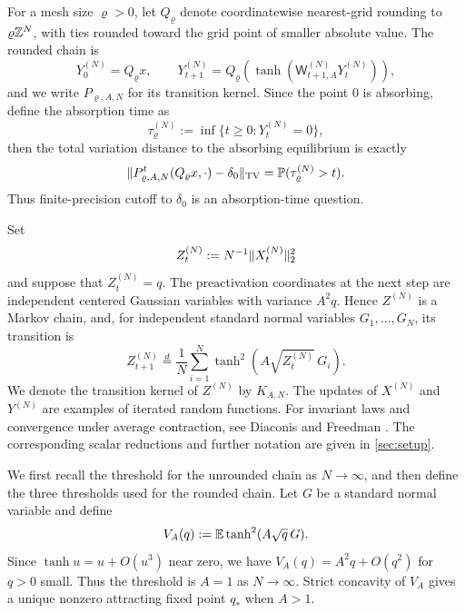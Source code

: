 \documentclass[11pt,reqno,a4paper]{article}
\newcommand{\Pp}{\P}
\newcommand{\Ee}{\E}
\newcommand{\TV}{\mathrm{TV}}
\begin{document}
For a mesh size $\varrho>0$, let $Q_\varrho$ denote coordinatewise
nearest-grid rounding to $\varrho\mathbb{Z}^N$, with ties rounded toward the grid
point of smaller absolute value. The rounded chain is
\begin{equation}\label{eq:intro-rounded-chain}
  Y_0^{(N)}=Q_\varrho x,
  \qquad
  Y_{t+1}^{(N)}
  =
  Q_\varrho\left(
    \tanh\left(\mathsf W_{t+1,A}^{(N)}Y_t^{(N)}\right)
  \right),
\end{equation}
and we write $P_{\varrho,A,N}$ for its transition kernel. Since the point $0$ is
absorbing, define the absorption time as
\begin{equation}\label{eq:intro-absorption-time}
  \tau_\varrho^{(N)}
  :=
  \inf\{t\geq0:Y_t^{(N)}=0\},
\end{equation}
then the total variation distance to the absorbing equilibrium is exactly
\begin{equation}\label{eq:intro-tv-absorption}
  \norm{
    P_{\varrho,A,N}^t(Q_\varrho x,\cdot)-\delta_0
  }_{\TV}
  =
  \Pp(\tau_\varrho^{(N)}>t).
\end{equation}
Thus finite-precision cutoff to $\delta_0$ is an absorption-time question.

Set
\begin{equation*}
  Z_t^{(N)}:=N^{-1}\lVert X_t^{(N)}\rVert_2^2
\end{equation*}
and suppose that $Z_t^{(N)}=q$. The preactivation coordinates at the next
step are independent centered Gaussian variables with variance $A^2q$.
Hence $Z^{(N)}$ is a Markov chain, and, for independent standard normal
variables $G_1,\ldots,G_N$, its transition is
\begin{equation}\label{eq:intro-radius-chain}
  Z_{t+1}^{(N)}
  \stackrel{d}{=}
  \frac1N\sum_{i=1}^N
  \tanh^2\left(A\sqrt{Z_t^{(N)}}\,G_i\right).
\end{equation}
We denote the transition kernel of $Z^{(N)}$ by $K_{A,N}$.
The updates of $X^{(N)}$ and $Y^{(N)}$ are examples of iterated random
functions. For invariant laws and convergence under average contraction, see
Diaconis and Freedman \cite{diaconis-freedman1999}. The corresponding
scalar reductions and further notation are given in \cref{sec:setup}.

\smallskip

We first recall the threshold for the unrounded chain as $N\to\infty$, and
then define the three thresholds used for the rounded chain. Let $G$ be a
standard normal variable and define
\begin{equation}\label{eq:intro-mean-field-map}
  V_A(q):=\Ee\tanh^2(A\sqrt q\,G).
\end{equation}
Since $\tanh u=u+O(u^3)$ near zero, we have
$V_A(q)=A^2q+O(q^2)$ for $q>0$ small. Thus the threshold is $A=1$ as
$N\to\infty$. Strict concavity of $V_A$ gives a unique nonzero attracting
fixed point $q_\ast$ when $A>1$.
\end{document}
